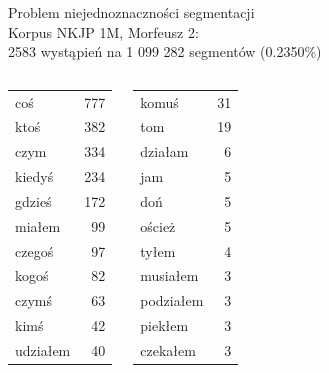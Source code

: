 \documentclass[xcolor=dvipsnames,polish]{beamer}
\begin{document}
\begin{frame}{Problem niejednoznaczności segmentacji}
  \\
  Korpus NKJP 1M, Morfeusz 2:\\
  2583 wystąpień na 1 099 282 segmentów (0.2350\%)
  \begin{columns}[c]
    \begin{center}
      \footnotesize
      \begin{tabular}{l|r}
        coś & 777 \\
        ktoś & 382 \\
        czym & 334 \\
        kiedyś & 234 \\
        gdzieś & 172 \\
        miałem & 99 \\
        czegoś & 97 \\
        kogoś & 82 \\
        czymś & 63 \\
        kimś & 42 \\
        udziałem & 40 \\
      \end{tabular}
    \end{center}
    \begin{center}
      \footnotesize
      \begin{tabular}{l|r}
        komuś & 31 \\
        tom & 19 \\
        działam & 6 \\
        jam & 5 \\
        doń & 5 \\
        oścież & 5 \\
        tyłem & 4 \\
        musiałem & 3 \\
        podziałem & 3 \\
        piekłem & 3 \\
       czekałem & 3 \\
      \end{tabular}
    \end{center}
    \begin{center}
      \footnotesize
      \begin{tabular}{l|r}


\end{tabular}
\end{center}
\end{columns}
\end{frame}
\end{document}
